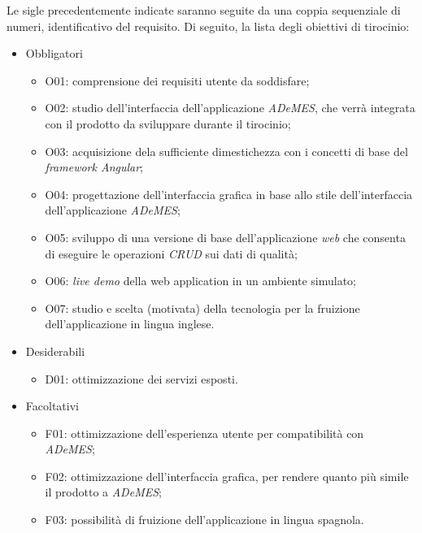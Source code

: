 Le sigle precedentemente indicate saranno seguite da una coppia sequenziale di numeri, identificativo del requisito.
Di seguito, la lista degli obiettivi di tirocinio:
\begin{itemize}
    \item Obbligatori
        \begin{itemize}
            \item O01: comprensione dei requisiti utente da soddisfare;
            \item O02: studio dell'interfaccia dell'applicazione \textit{ADeMES}, che verrà integrata con il prodotto da sviluppare durante il tirocinio;
            \item O03: acquisizione dela sufficiente dimestichezza con i concetti di base del \textit{framework Angular};
            \item O04: progettazione dell'interfaccia grafica in base allo stile dell'interfaccia dell'applicazione \textit{ADeMES};
            \item O05: sviluppo di una versione di base dell'applicazione \textit{web} che consenta di eseguire le operazioni \textit{CRUD} sui dati di qualità;  
            \item O06: \textit{live demo} della web application in un ambiente simulato;
            \item O07: studio e scelta (motivata) della tecnologia per la fruizione dell'applicazione in lingua inglese.
        \end{itemize}
    \item Desiderabili
        \begin{itemize}
            \item D01: ottimizzazione dei servizi  esposti.
        \end{itemize}
    \item Facoltativi
        \begin{itemize}
            \item F01: ottimizzazione dell'esperienza utente per compatibilità con \textit{ADeMES};
            \item F02: ottimizzazione dell'interfaccia grafica, per rendere quanto più simile il prodotto a \textit{ADeMES};
            \item F03: possibilità di fruizione dell'applicazione in lingua spagnola.
        \end{itemize}
\end{itemize}



